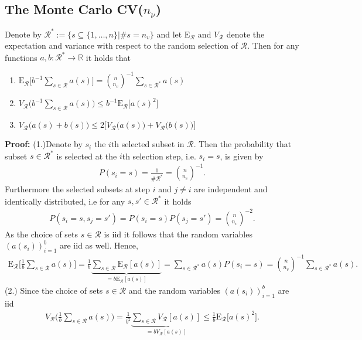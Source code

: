 \documentclass[Research_Module_ES.tex]{subfiles}
\begin{document}
\subsection{The Monte Carlo CV($n_\nu$)}

\begin{lemma} Denote by $\mathcal{R}^\ast:= \{s\subseteq\{1,\dots,n\}|\# s=n_v\}$ and let $\mathrm{E}_\mathcal{R}$ and $V_\mathcal{R}$ denote the expectation and variance with respect to the random selection of $\mathcal{R}$. Then for any functions $a,b:\mathcal{R}^\ast\to \mathbb{R}$ it holds that
\begin{enumerate}
\item $\mathrm{E}_\mathcal{R} \bigl[ b^{-1}\sum_{s\in \mathcal{R}}a(s)\bigr] = \binom{n}{n_v}^{-1}\sum_{s\in\mathcal{R}^\ast}a(s)$
\item $V_\mathcal{R} \bigl( b^{-1}\sum_{s\in \mathcal{R}}a(s)\bigr) \le b^{-1} \mathrm{E}_\mathcal{R} \bigl[a(s)^2\bigr]$
\item $V_\mathcal{R}\bigl(a(s)+b(s)\bigr) \le 2\bigl[V_\mathcal{R}\bigl(a(s)\bigr)+V_\mathcal{R}\bigl(b(s)\bigr)\bigr]$
\end{enumerate}
\end{lemma}
\textbf{Proof:}
(1.)Denote by $s_i$ the $i$th selected subset in $\mathcal{R}$. Then the probability that subset $s \in \mathcal{R}^\ast$ is selected at the $i$th selection step, i.e. $s_i=s$, is given by
\begin{align*}
P(s_i=s)= \frac{1}{\# \mathcal{R}^\ast} = \binom{n}{n_v}^{-1}.
\end{align*}
Furthermore the selected subsets at step $i$ and $j\neq i$ are independent and identically distributed, i.e for any $s,s'\in \mathcal{R}^\ast$ it holds
\begin{align*}
P(s_i=s,s_j=s')=P(s_i=s)P(s_j=s')=\binom{n}{n_v}^{-2}.
\end{align*}
As the choice of sets $s\in \mathcal{R}$ is iid it follows that the random variables $(a(s_i))_{i=1}^b$ are iid as well. Hence, 
\begin{align*}
\mathrm{E}_\mathcal{R} \biggl[ \frac{1}{b}\sum_{s\in \mathcal{R}}a(s)\biggr] 
= \frac{1}{b}\underbrace{\sum_{s\in \mathcal{R}}\mathrm{E}_\mathcal{R} [a(s)]}_{=b\mathrm{E}_\mathcal{R}[a(s)]}
= \sum_{s\in \mathcal{R}^\ast}a(s)P(s_i = s)
=\binom{n}{n_v}^{-1}\sum_{s\in\mathcal{R}^\ast}a(s).
\end{align*}
(2.) Since the choice of sets $s\in \mathcal{R}$ and the random variables $(a(s_i))_{i=1}^b$ are iid
\begin{align*}
V_\mathcal{R} \biggl(\frac{1}{b}\sum_{s\in \mathcal{R}}a(s)\biggr)
= \frac{1}{b^2}\underbrace{\sum_{s\in \mathcal{R}}V_\mathcal{R} [a(s)]}_{=bV_\mathcal{R} [a(s)]}
\le \frac{1}{b}\mathrm{E}_\mathcal{R}\bigl[a(s)^2\bigr].
\end{align*}
\end{document}
